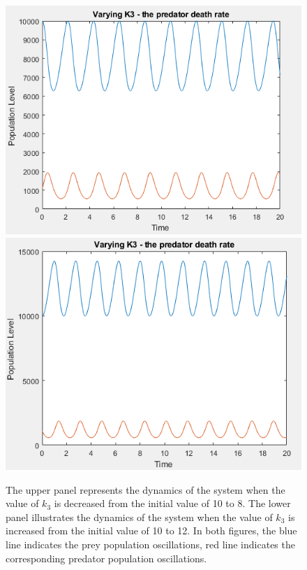 \documentclass{article}
\begin{document}
\begin{figure}[H]
    \includegraphics[scale = 0.8]{k3_low.PNG}
    \includegraphics[scale = 0.82]{k3_high.PNG}
    \caption{The upper panel represents the dynamics of the system when the value of $k_3$ is decreased from the initial value of 10 to 8. The lower panel illustrates the dynamics of the system when the value of $k_3$ is increased from the initial value of 10 to 12. In both figures, the blue line indicates the prey population oscillations, red line indicates the corresponding predator population oscillations.}
    \label{fig:k3_vals}
\end{figure}
\end{document}
